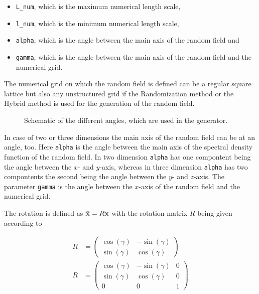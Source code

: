\documentclass[12pt]{report}
\begin{document}
\begin{itemize}
	\item {\tt L\_num}, which is the maximum numerical length scale, 
	\item {\tt l\_num}, which is the minimum numerical length scale,
	\item {\tt alpha}, which is the angle between the main axis of the random field and
	\item {\tt gamma}, which is the angle between the main axis of the random field and the numerical grid.
\end{itemize}

The numerical grid on which the random field is defined can be a regular square lattice but also any unstructured grid if the Randomization method or the Hybrid method is used for the generation of the random field. 

\begin{figure}[ht]
	\centering
	
	\caption{Schematic of the different angles, which are used in the generator.}
	\label{fig:Angles}
\end{figure}

In case of two or three dimensions the main axis of the random field can be at an angle, too. Here {\tt alpha} is the angle between the main axis of the spectral density function of the random field. In two dimension {\tt alpha} has one compontent being the angle between the $x$- and $y$-axis, whereas in three dimension {\tt alpha} has two compontents the second being the angle between the $y$- and $z$-axis. The parameter {\tt gamma} is the angle between the $x$-axis of the random field and the numerical grid.

The rotation is defined as $\tilde{{\bf x}} = R {\bf x}$ with the rotation matrix $R$ being given according to

\begin{subequations}
\begin{align}
	R & = \left( \begin{array}{cc} \cos(\gamma) & -\sin(\gamma) \\ \sin(\gamma) & \cos(\gamma) \end{array} \right) \\
	R & = \left( \begin{array}{ccc} \cos(\gamma) & -\sin(\gamma) & 0 \\ \sin(\gamma) & \cos(\gamma) & 0  \\ 0 & 0 & 1 \end{array} \right)
\end{align}
\end{subequations}
\end{document}
